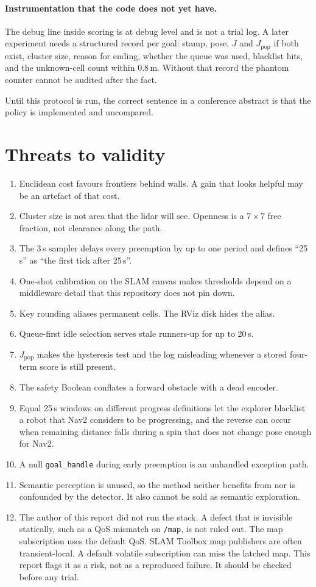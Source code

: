 \documentclass[11pt]{article}
\begin{document}
\paragraph{Instrumentation that the code does not yet have.}
The debug line inside scoring is at debug level and is not a trial log. A later experiment needs a structured record per goal: stamp, pose, $J$ and $J_{\mathrm{pop}}$ if both exist, cluster size, reason for ending, whether the queue was used, blacklist hits, and the unknown-cell count within $0.8$\,m. Without that record the phantom counter cannot be audited after the fact.

Until this protocol is run, the correct sentence in a conference abstract is that the policy is implemented and uncompared.

\section{Threats to validity}
\label{sec:threats}
\begin{enumerate}
\item Euclidean cost favours frontiers behind walls. A gain that looks helpful may be an artefact of that cost.
\item Cluster size is not area that the lidar will see. Openness is a $7\times 7$ free fraction, not clearance along the path.
\item The 3\,s sampler delays every preemption by up to one period and defines ``25\,s'' as ``the first tick after 25\,s''.
\item One-shot calibration on the SLAM canvas makes thresholds depend on a middleware detail that this repository does not pin down.
\item Key rounding aliases permanent cells. The RViz disk hides the alias.
\item Queue-first idle selection serves stale runners-up for up to 20\,s.
\item $J_{\mathrm{pop}}$ makes the hysteresis test and the log misleading whenever a stored four-term score is still present.
\item The safety Boolean conflates a forward obstacle with a dead encoder.
\item Equal 25\,s windows on different progress definitions let the explorer blacklist a robot that Nav2 considers to be progressing, and the reverse can occur when remaining distance falls during a spin that does not change pose enough for Nav2.
\item A null \texttt{goal\_handle} during early preemption is an unhandled exception path.
\item Semantic perception is unused, so the method neither benefits from nor is confounded by the detector. It also cannot be sold as semantic exploration.
\item The author of this report did not run the stack. A defect that is invisible statically, such as a QoS mismatch on \texttt{/map}, is not ruled out. The map subscription uses the default QoS. SLAM Toolbox map publishers are often transient-local. A default volatile subscription can miss the latched map. This report flags it as a risk, not as a reproduced failure. It should be checked before any trial.
\end{enumerate}
\end{document}
